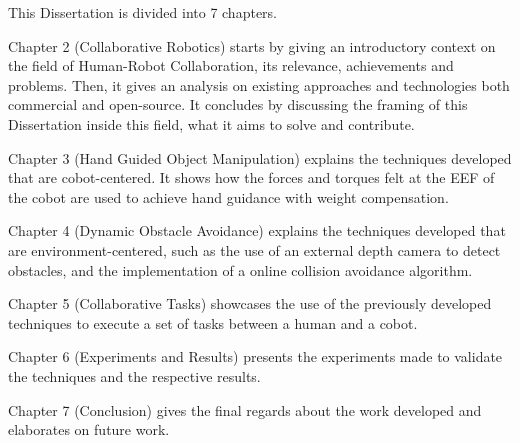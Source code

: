 \par This Dissertation is divided into 7 chapters.
\par Chapter 2 (Collaborative Robotics) starts by giving an introductory context on the field of 
Human-Robot Collaboration, its relevance, achievements and problems. Then, it gives an analysis on 
existing approaches and technologies both commercial and open-source. It concludes by discussing the 
framing of this Dissertation inside this field, what it aims to solve and contribute.
\par Chapter 3 (Hand Guided Object Manipulation) explains the techniques developed that are 
cobot-centered. It shows how the forces and torques felt at the EEF of the cobot are used to 
achieve hand guidance with weight compensation.
\par Chapter 4 (Dynamic Obstacle Avoidance) explains the techniques developed that are 
environment-centered, such as the use of an external depth camera to detect obstacles, and the 
implementation of a online collision avoidance algorithm.
\par Chapter 5 (Collaborative Tasks) showcases the use of the previously developed techniques to 
execute a set of tasks between a human and a cobot.
\par Chapter 6 (Experiments and Results) presents the experiments made to validate the techniques and 
the respective results.
\par Chapter 7 (Conclusion) gives the final regards about the work developed and elaborates on future 
work.

